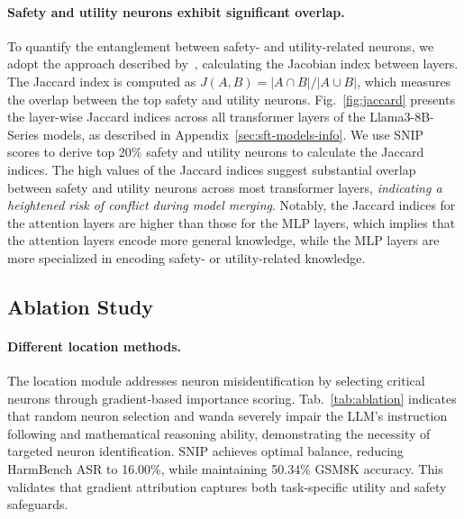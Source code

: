 \paragraph{Safety and utility neurons exhibit significant overlap.}
To quantify the entanglement between safety- and utility-related neurons, we adopt the approach described by~\citet{wei}, calculating the Jacobian index between layers. The Jaccard index is computed as $J(A, B) = |A\cap B|/|A\cup B|$, which measures the overlap between the top safety and utility neurons. 
Fig.~\ref{fig:jaccard} presents the layer-wise Jaccard indices across all transformer layers of the Llama3-8B-Series models, as described in Appendix~\ref{sec:sft-models-info}. We use SNIP~\cite{snip} scores to derive top 20\% safety and utility neurons to calculate the Jaccard indices. The high values of the Jaccard indices suggest substantial overlap between safety and utility neurons across most transformer layers, \textit{indicating a heightened risk of conflict during model merging}. Notably, the Jaccard indices for the attention layers are higher than those for the MLP layers, which implies that the attention layers encode more general knowledge, while the MLP layers are more specialized in encoding safety- or utility-related knowledge. 





\subsection{Ablation Study}
\label{sec:ablation}

\paragraph{Different location methods.}
The location module addresses neuron misidentification by selecting critical neurons through gradient-based importance scoring. Tab.~\ref{tab:ablation} indicates that random neuron selection and wanda severely impair the LLM's instruction following and mathematical reasoning ability, demonstrating the necessity of targeted neuron identification. SNIP achieves optimal balance, reducing HarmBench ASR to 16.00\%, while maintaining 50.34\% GSM8K accuracy. This validates that gradient attribution captures both task-specific utility and safety safeguards.


